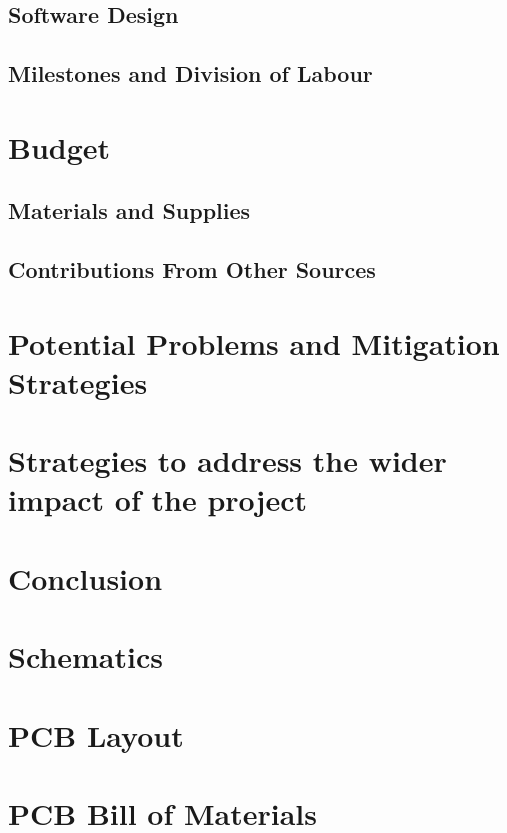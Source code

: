 \documentclass[letterpaper,12pt]{article}
\begin{document}
\subsection{Software Design}
\subsection{Milestones and Division of Labour}
\section{Budget} %
\subsection{Materials and Supplies}
\subsection{Contributions From Other Sources}

\section{Potential Problems and Mitigation Strategies}
\section{Strategies to address the wider impact of the project}
\section{Conclusion}
\newpage


\newpage

\begin{appendices}
    \section{Schematics}
    \label{appendix:schematic}
    \section{PCB Layout}
    \label{appendix:layout}
    \section{PCB Bill of Materials}
    \label{appendix:bom}
\end{appendices}
\end{document}
